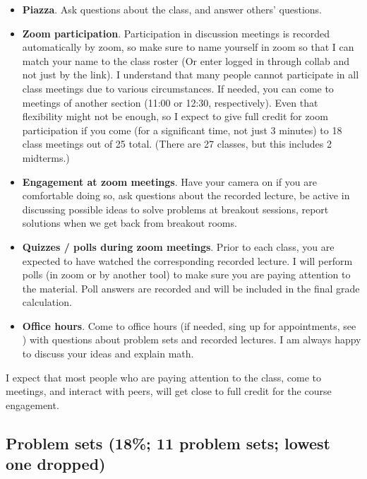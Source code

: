 \documentclass[oneside,11pt]{amsart}
\begin{document}
\begin{itemize}
	\item \textbf{Piazza}. Ask questions about the class, and answer others' questions.
	\item \textbf{Zoom participation}. Participation in discussion meetings is recorded automatically by zoom, 
		so make sure to name yourself in zoom so that I can match your name to the class roster
		(Or enter logged in through collab and not just by the link).
		I understand that many people cannot participate in all class meetings due to various
		circumstances. If needed,
		you can come to meetings of another section (11:00 or 12:30, respectively).
		Even that flexibility might not be enough, so I expect to give full credit for zoom participation 
		if you come (for a significant time, not just 3 minutes) to 18 class meetings out of 25 total.
		(There are 27 classes, but this includes 2 midterms.)
	\item \textbf{Engagement at zoom meetings}. 
		Have your camera on if you are comfortable doing so,
		ask questions about the recorded
		lecture, be active in discussing possible ideas to solve problems at breakout sessions, 
		report solutions when we get back from breakout rooms.
	\item \textbf{Quizzes / polls during zoom meetings}. 
		Prior to each class, you are expected to have watched the corresponding recorded lecture.
		I will perform polls (in zoom or by another tool)
		to make sure you are paying attention to the material. 
		Poll answers are recorded and will be included in the final grade calculation.
	\item \textbf{Office hours}. Come to office hours (if needed, 
		sing up for appointments, see ) 
		with questions about problem sets and recorded lectures.
		I am always happy to discuss your ideas and explain math.
\end{itemize}

I expect that most people who are paying attention to the class,
come to meetings, and interact with peers, will get close to full credit for
the course engagement.

\subsection{Problem sets (18\%; 11 problem sets; lowest one dropped)}
\end{document}
